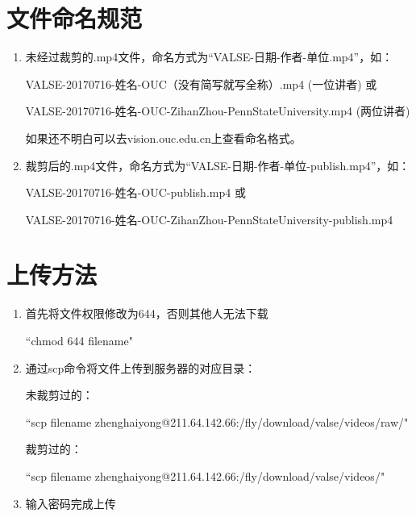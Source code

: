 \documentclass[12pt]{ctexart}
\begin{document}
\section{文件命名规范}
\begin{enumerate}
 \item 未经过裁剪的.mp4文件，命名方式为“VALSE-日期-作者-单位.mp4”，如：

  {\color{blue}VALSE-20170716-姓名-OUC（没有简写就写全称）.mp4 (一位讲者)}  或

  {\color{blue}VALSE-20170716-姓名-OUC-ZihanZhou-PennStateUniversity.mp4 (两位讲者)}

如果还不明白可以去vision.ouc.edu.cn上查看命名格式。
 \item 裁剪后的.mp4文件，命名方式为“VALSE-日期-作者-单位-publish.mp4”，如：

  {\color{blue}VALSE-20170716-姓名-OUC-publish.mp4}  或

  {\color{blue}VALSE-20170716-姓名-OUC-ZihanZhou-PennStateUniversity-publish.mp4}

\end{enumerate}
\section{上传方法}
\begin{enumerate}
 \item 首先将文件权限修改为644，否则其他人无法下载

   ``chmod 644 filename"

 \item 通过scp命令将文件上传到服务器的对应目录：

{\color{blue}未裁剪过的：}

  ``scp filename zhenghaiyong@211.64.142.66:/fly/download/valse/videos/raw/"

{\color{blue}裁剪过的：}

  ``scp filename zhenghaiyong@211.64.142.66:/fly/download/valse/videos/"

 \item 输入密码完成上传

\end{enumerate}
\end{document}
